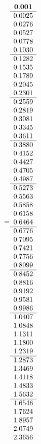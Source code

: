 =\hbox{$\begin{array}{c}
\bf 0.001 
 \\ \hline 
  0.0025 \\ 
  0.0276 \\ 
  0.0527 \\ 
  0.0778 \\ 
  0.1030
 \\ \hline 
  0.1282 \\ 
  0.1535 \\ 
  0.1789 \\ 
  0.2045 \\ 
  0.2301
 \\ \hline 
  0.2559 \\ 
  0.2819 \\ 
  0.3081 \\ 
  0.3345 \\ 
  0.3611
 \\ \hline 
  0.3880 \\ 
  0.4152 \\ 
  0.4427 \\ 
  0.4705 \\ 
  0.4987
 \\ \hline 
  0.5273 \\ 
  0.5563 \\ 
  0.5858 \\ 
  0.6158 \\ 
  0.6464
 \\ \hline 
  0.6776 \\ 
  0.7095 \\ 
  0.7421 \\ 
  0.7756 \\ 
  0.8099
 \\ \hline 
  0.8452 \\ 
  0.8816 \\ 
  0.9192 \\ 
  0.9581 \\ 
  0.9986
 \\ \hline 
  1.0407 \\ 
  1.0848 \\ 
  1.1311 \\ 
  1.1800 \\ 
  1.2319
 \\ \hline 
  1.2873 \\ 
  1.3469 \\ 
  1.4118 \\ 
  1.4833 \\ 
  1.5632
 \\ \hline 
  1.6546 \\ 
  1.7624 \\ 
  1.8957 \\ 
  2.0749 \\ 
  2.3656
 \end{array}$}
